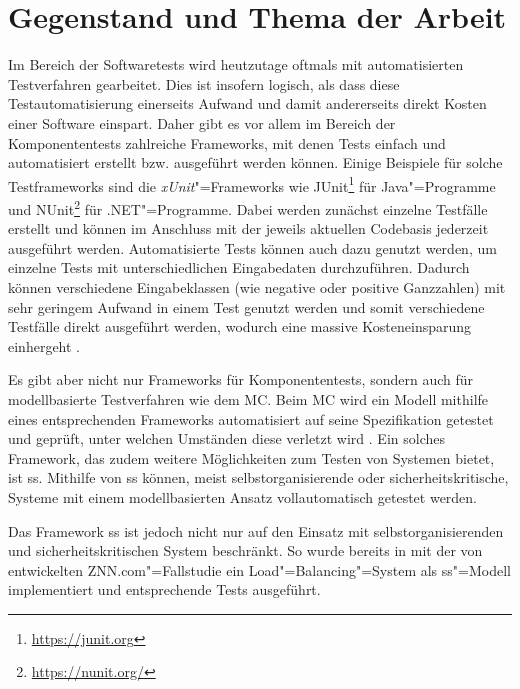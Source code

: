 \chapter{Gegenstand und Thema der Arbeit}
\label{ch:intro}

Im Bereich der Softwaretests wird heutzutage oftmals mit automatisierten Testverfahren gearbeitet.
Dies ist insofern logisch, als dass diese Testautomatisierung einerseits Aufwand und damit andererseits direkt Kosten einer Software einspart.
Daher gibt es vor allem im Bereich der Komponententests zahlreiche Frameworks, mit denen Tests einfach und automatisiert erstellt bzw. ausgeführt werden können.
Einige Beispiele für solche Testframeworks sind die \emph{xUnit}"=Frameworks wie JUnit\footnote{\url{https://junit.org}} für Java"=Programme und NUnit\footnote{\url{https://nunit.org/}} für .NET"=Programme.
Dabei werden zunächst einzelne Testfälle erstellt und können im Anschluss mit der jeweils aktuellen Codebasis jederzeit ausgeführt werden.
Automatisierte Tests können auch dazu genutzt werden, um einzelne Tests mit unterschiedlichen Eingabedaten durchzuführen.
Dadurch können verschiedene Eingabeklassen (wie negative oder positive Ganzzahlen) mit sehr geringem Aufwand in einem Test genutzt werden und somit verschiedene Testfälle direkt ausgeführt werden, wodurch eine massive Kosteneinsparung einhergeht \cite{Polo2013}.

Es gibt aber nicht nur Frameworks für Komponententests, sondern auch für modellbasierte Testverfahren wie \zB dem \gls{MC}.
Beim \gls{MC} wird ein Modell mithilfe eines entsprechenden Frameworks automatisiert auf seine Spezifikation getestet und geprüft, unter welchen Umständen diese verletzt wird \cite{Grumberg1999,Habermaier2015}.
Ein solches Framework, das zudem weitere Möglichkeiten zum Testen von Systemen bietet, ist \gls{ss}.
Mithilfe von \gls{ss} können, meist selbstorganisierende oder sicherheitskritische, Systeme mit einem modellbasierten Ansatz vollautomatisch getestet werden.

Das Framework \gls{ss} ist jedoch nicht nur auf den Einsatz mit selbstorganisierenden und sicherheitskritischen System beschränkt.
So wurde bereits in \cite{Eberhardinger2017} mit der von \citeauthor{Cheng2008} entwickelten ZNN.com"=Fallstudie \cite{Cheng2008} ein Load"=Balancing"=System als \gls{ss}"=Modell implementiert und entsprechende Tests ausgeführt.

